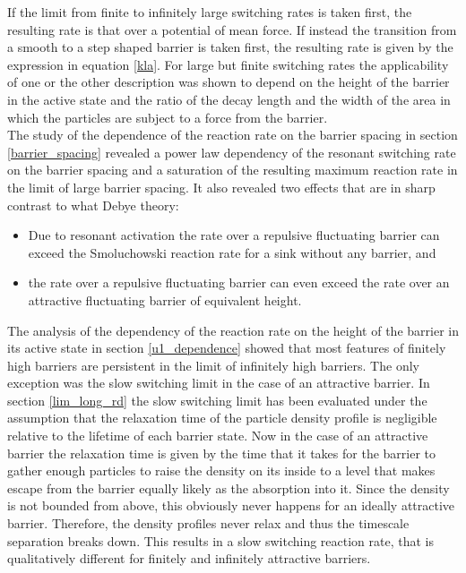 If the limit from finite to infinitely large switching rates is taken first, the resulting rate is that over a potential of mean force. If instead the transition from a smooth to a step shaped barrier is taken first, the resulting rate is given by the expression in equation \eqref{kla}. For large but finite switching rates the applicability of one or the other description was shown to depend on the height of the barrier in the active state and the ratio of the decay length and the width of the area in which the particles are subject to a force from the barrier. \\
The study of the dependence of the reaction rate on the barrier spacing in section \ref{barrier_spacing} revealed a power law dependency of the resonant switching rate on the barrier spacing and a saturation of the resulting maximum reaction rate in the limit of large barrier spacing. It also revealed two effects that are in sharp contrast to what Debye theory:
\begin{itemize}
    \item Due to resonant activation the rate over a repulsive fluctuating barrier can exceed the Smoluchowski reaction rate for a sink without any barrier, and
    \item the rate over a repulsive fluctuating barrier can even exceed the rate over an attractive fluctuating barrier of equivalent height.
\end{itemize}
The analysis of the dependency of the reaction rate on the height of the barrier in its active state in section \ref{u1_dependence} showed that most features of finitely high barriers are persistent in the limit of infinitely high barriers. The only exception was the slow switching limit in the case of an attractive barrier. In section \ref{lim_long_rd} the slow switching limit has been evaluated under the assumption that the relaxation time of the particle density profile is negligible relative to the lifetime of each barrier state. Now in the case of an attractive barrier the relaxation time is given by the time that it takes for the barrier to gather enough particles to raise the density on its inside to a level that makes escape from the barrier equally likely as the absorption into it. Since the density is not bounded from above, this obviously never happens for an ideally attractive barrier. Therefore, the density profiles never relax and thus the timescale separation breaks down. This results in a slow switching reaction rate, that is qualitatively different for finitely and infinitely attractive barriers. \\
